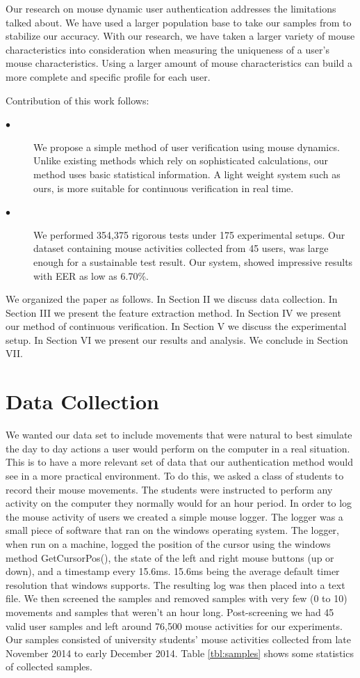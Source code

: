 \documentclass[conference]{IEEEtran}
\begin{document}
Our research on mouse dynamic user authentication addresses the limitations talked about. We have used a larger population base to take our samples from to stabilize our accuracy. With our research, we have taken a larger variety of mouse characteristics into consideration when measuring the uniqueness of a user’s mouse characteristics. Using a larger amount of mouse characteristics can build a more complete and specific profile for each user. 

Contribution of this work follows:

\begin{description}
  \item[$\bullet$] We propose a simple method of user verification using mouse dynamics. Unlike existing methods which rely on sophisticated calculations, our method uses basic statistical information. A light weight system such as ours, is more suitable for continuous verification in real time.  
  \item[$\bullet$] We performed 354,375 rigorous tests under 175 experimental setups. Our dataset containing mouse activities collected from 45 users, was large enough for a sustainable test result. Our system, showed impressive results with EER as low as 6.70\%.
\end{description} 

We organized the paper as follows. In Section II we discuss data collection. In Section III we present the feature extraction method. In Section IV we present our method of continuous verification. In Section V we discuss the experimental setup. In Section VI we present our results and analysis. We conclude in Section VII.   

\section{Data Collection}
We wanted our data set to include movements that were natural to best simulate the day to day actions a user would perform on the computer in a real situation. This is to have a more relevant set of data that our authentication method would see in a more practical environment. To do this, we asked a class of students to record their mouse movements. The students were instructed to perform any activity on the computer they normally would for an hour period.
	In order to log the mouse activity of users we created a simple mouse logger.  The logger was a small piece of software that ran on the windows operating system. The logger, when run on a machine, logged the position of the cursor using the windows method GetCursorPos(), the state of the left and right mouse buttons (up or down), and a timestamp every 15.6ms. 15.6ms being the average default timer resolution that windows supports. The resulting log was then placed into a text file. 
We then screened the samples and removed samples with very few (0 to 10) movements and samples that weren't an hour long. Post-screening we had 45 valid user samples and left around 76,500 mouse activities for our experiments. Our samples consisted of university students' mouse activities collected from late November 2014 to early December 2014. Table \ref{tbl:samples} shows some statistics of collected samples.
\end{document}

